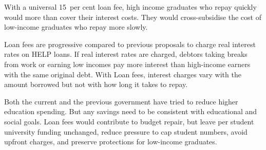 \documentclass[embargoed]{grattan}
\begin{document}
\begin{overview}
With a universal 15~per cent loan fee, high income graduates who repay quickly would more than cover their interest costs. They would cross-subsidise the cost of low-income graduates who repay more slowly.

\Gls{Loan fees} are progressive compared to previous proposals to charge real interest rates on \gls{HELP} loans.
If real interest rates are charged, debtors taking breaks from work or earning low incomes pay more interest than high-income earners with the same original debt.
With \gls{Loan fees}, interest charges vary with the amount borrowed but not with how long it takes to repay. 

Both the current and the previous government have tried to reduce higher education spending. But any savings need to be consistent with educational and social goals.
\Gls{Loan fees} would contribute to budget repair, but leave per student university funding unchanged, reduce pressure to cap student numbers, avoid upfront charges, and preserve protections for low-income graduates.
\end{overview}

\contentspage
\listoffigures







\end{document}
